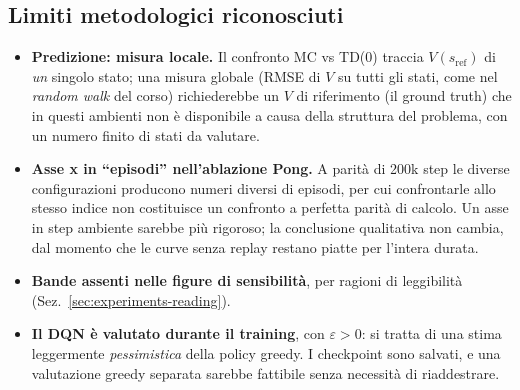 \subsection{Limiti metodologici riconosciuti}
\begin{itemize}
  \item \textbf{Predizione: misura locale.} Il confronto MC vs TD(0) traccia
        $V(s_{\text{ref}})$ di \emph{un} singolo stato; una misura globale (RMSE di $V$
        su tutti gli stati, come nel \emph{random walk} del corso) richiederebbe un $V$
        di riferimento (il ground truth) che in questi ambienti non \`e disponibile a causa della struttura
        del problema, con un numero finito di stati da valutare.
  \item \textbf{Asse x in ``episodi'' nell'ablazione Pong.} A parit\`a di 200k step le
        diverse configurazioni producono numeri diversi di episodi, per cui confrontarle
        allo stesso indice non costituisce un confronto a perfetta parit\`a di calcolo. Un
        asse in step ambiente sarebbe pi\`u rigoroso; la conclusione qualitativa non
        cambia, dal momento che le curve senza replay restano piatte per l'intera durata.
  \item \textbf{Bande assenti nelle figure di sensibilit\`a}, per ragioni di
        leggibilit\`a (Sez.~\ref{sec:experiments-reading}).
  \item \textbf{Il DQN \`e valutato durante il training}, con $\varepsilon > 0$: si
        tratta di una stima leggermente \emph{pessimistica} della policy greedy. I
        checkpoint sono salvati, e una valutazione greedy separata sarebbe fattibile senza
        necessit\`a di riaddestrare.
\end{itemize}

